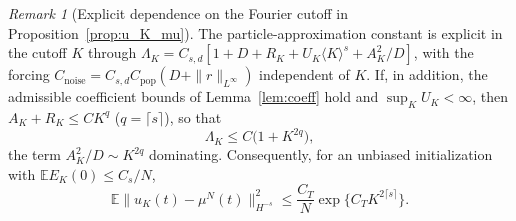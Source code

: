 \documentclass[a4paper,fleqn]{cas-sc}
\theoremstyle{definition}
\newtheorem{definition}[theorem]{Definition}
\theoremstyle{remark}
\newtheorem{remark}[theorem]{Remark}
\begin{document}
\begin{remark}[Explicit dependence on the Fourier cutoff in Proposition~\ref{prop:u_K_mu}]
\label{rem:K-prop3}
The particle-approximation constant is explicit in the cutoff $K$ through
$\Lambda_K=C_{s,d}[1+D+R_K+U_K\langle K\rangle^{s}+A_K^2/D]$, with the forcing
$C_{\mathrm{noise}}=C_{s,d}C_{\mathrm{pop}}(D+\|r\|_{L^\infty})$ independent of $K$. If, in addition,
the admissible coefficient bounds of Lemma~\ref{lem:coeff} hold and $\sup_KU_K<\infty$,
then $A_K+R_K\le CK^{q}$ ($q=\lceil s\rceil$), so that
\[
\Lambda_K\le C\bigl(1+K^{2q}\bigr),
\]
the term $A_K^2/D\sim K^{2q}$ dominating. Consequently, for an unbiased initialization
with $\mathbb E E_K(0)\le C_s/N$,
\[
\mathbb E\|u_K(t)-\mu^N(t)\|_{H^{-s}}^2\le\frac{C_T}{N}\exp\!\bigl\{C_TK^{2\lceil s\rceil}\bigr\}.
\]
\end{remark}


\end{document}
